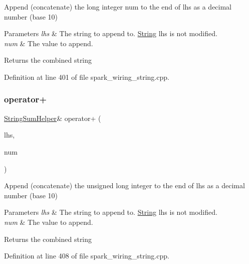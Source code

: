 Append (concatenate) the long integer num to the end of lhs as a decimal number (base 10) 


\begin{DoxyParams}{Parameters}
{\em lhs} & The string to append to. \hyperlink{class_string}{String} lhs is not modified.\\
\hline
{\em num} & The value to append.\\
\hline
\end{DoxyParams}
\begin{DoxyReturn}{Returns}
the combined string 
\end{DoxyReturn}


Definition at line 401 of file spark\+\_\+wiring\+\_\+string.\+cpp.

\mbox{\label{class_string_a61625af689cfcbe9206851903b1144a2}} 
\subsubsection{\texorpdfstring{operator+}{operator+}\hspace{0.1cm}{\footnotesize\ttfamily [8/10]}}
{\footnotesize\ttfamily \hyperlink{class_string_sum_helper}{String\+Sum\+Helper}\& operator+ (\begin{DoxyParamCaption}\item[{const \hyperlink{class_string_sum_helper}{String\+Sum\+Helper} \&}]{lhs,  }\item[{unsigned long}]{num }\end{DoxyParamCaption})\hspace{0.3cm}{\ttfamily [friend]}}



Append (concatenate) the unsigned long integer to the end of lhs as a decimal number (base 10) 


\begin{DoxyParams}{Parameters}
{\em lhs} & The string to append to. \hyperlink{class_string}{String} lhs is not modified.\\
\hline
{\em num} & The value to append.\\
\hline
\end{DoxyParams}
\begin{DoxyReturn}{Returns}
the combined string 
\end{DoxyReturn}


Definition at line 408 of file spark\+\_\+wiring\+\_\+string.\+cpp.

